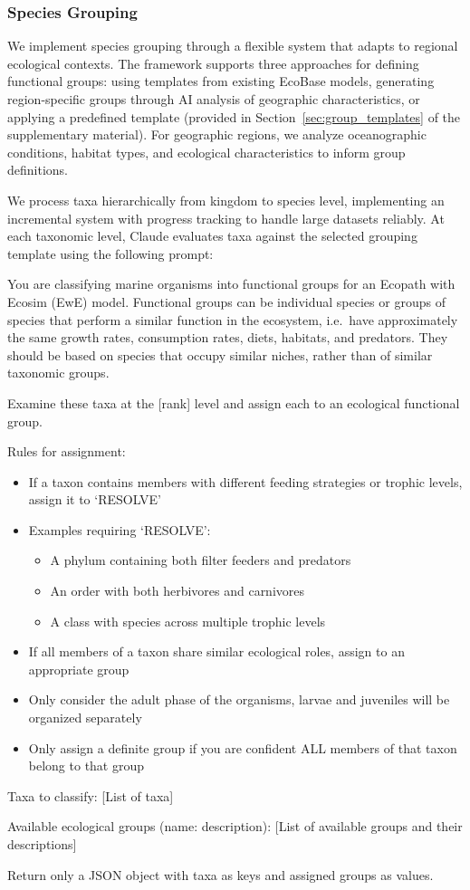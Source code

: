 \subsubsection{Species Grouping}

We implement species grouping through a flexible system that adapts to regional ecological contexts. The framework supports three approaches for defining functional groups: using templates from existing EcoBase models, generating region-specific groups through AI analysis of geographic characteristics, or applying a predefined template (provided in Section~\ref{sec:group_templates} of the supplementary material). For geographic regions, we analyze oceanographic conditions, habitat types, and ecological characteristics to inform group definitions.

We process taxa hierarchically from kingdom to species level, implementing an incremental system with progress tracking to handle large datasets reliably. At each taxonomic level, Claude evaluates taxa against the selected grouping template using the following prompt:

\begin{prompt}
You are classifying marine organisms into functional groups for an Ecopath with Ecosim (EwE) model. Functional groups can be individual species or groups of species that perform a similar function in the ecosystem, i.e.\ have approximately the same growth rates, consumption rates, diets, habitats, and predators. They should be based on species that occupy similar niches, rather than of similar taxonomic groups.

Examine these taxa at the [rank] level and assign each to an ecological functional group.

Rules for assignment:
\begin{itemize}
\item If a taxon contains members with different feeding strategies or trophic levels, assign it to `RESOLVE'
\item Examples requiring `RESOLVE':
  \begin{itemize}
  \item A phylum containing both filter feeders and predators
  \item An order with both herbivores and carnivores
  \item A class with species across multiple trophic levels
  \end{itemize}
\item If all members of a taxon share similar ecological roles, assign to an appropriate group
\item Only consider the adult phase of the organisms, larvae and juveniles will be organized separately
\item Only assign a definite group if you are confident ALL members of that taxon belong to that group
\end{itemize}

Taxa to classify:
[List of taxa]

Available ecological groups (name: description):
[List of available groups and their descriptions]

Return only a JSON object with taxa as keys and assigned groups as values.
\end{prompt}

